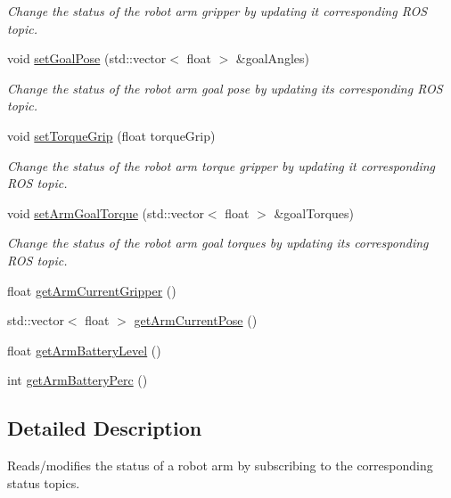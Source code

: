 \begin{DoxyCompactItemize}
\begin{DoxyCompactList}\small\item\em Change the status of the robot arm gripper by updating it corresponding R\+OS topic. \end{DoxyCompactList}\item 
void \hyperlink{class_robot_arm_status_aac708a0dd4f6d241a4ee7bb210495c48}{set\+Goal\+Pose} (std\+::vector$<$ float $>$ \&goal\+Angles)
\begin{DoxyCompactList}\small\item\em Change the status of the robot arm goal pose by updating its corresponding R\+OS topic. \end{DoxyCompactList}\item 
void \hyperlink{class_robot_arm_status_a4b90502f4a99fd4d94f66a695e7fe464}{set\+Torque\+Grip} (float torque\+Grip)
\begin{DoxyCompactList}\small\item\em Change the status of the robot arm torque gripper by updating it corresponding R\+OS topic. \end{DoxyCompactList}\item 
void \hyperlink{class_robot_arm_status_a5a97708433233733a09b963f861c7bbb}{set\+Arm\+Goal\+Torque} (std\+::vector$<$ float $>$ \&goal\+Torques)
\begin{DoxyCompactList}\small\item\em Change the status of the robot arm goal torques by updating its corresponding R\+OS topic. \end{DoxyCompactList}\item 
float \hyperlink{class_robot_arm_status_abd54fafd5e540f3034e49636708f290b}{get\+Arm\+Current\+Gripper} ()
\item 
std\+::vector$<$ float $>$ \hyperlink{class_robot_arm_status_ad88835812a9c12a335ce6f9808b4370a}{get\+Arm\+Current\+Pose} ()
\item 
float \hyperlink{class_robot_arm_status_a2166d4de6d367aa2583bff91c5e83a25}{get\+Arm\+Battery\+Level} ()
\item 
int \hyperlink{class_robot_arm_status_aa5b8c4143bb2553d22c2ea0763f97ac1}{get\+Arm\+Battery\+Perc} ()
\end{DoxyCompactItemize}


\subsection{Detailed Description}
Reads/modifies the status of a robot arm by subscribing to the corresponding status topics. 


